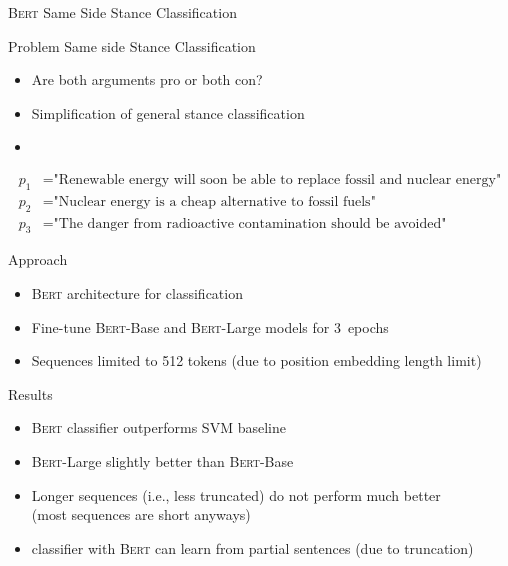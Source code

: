 \documentclass[english,handout]{mlutalk}
\newcommand{\Bert}{\textsc{Bert}\xspace}
\newcommand{\BertBase}{\textsc{Bert}-Base\xspace}
\newcommand{\BertLarge}{\textsc{Bert}-Large\xspace}
\begin{document}
\begin{frame}[allowframebreaks]{\Bert Same Side Stance Classification~\cite{OllingerDSBS2020}}
  
  \begin{block}{Problem}
    Same side  Stance Classification
    \begin{itemize}
      \item Are both arguments pro or both con?
      \item Simplification of general stance classification
      \item 
    \end{itemize}
  \end{block}

  \begin{example}
    \begin{align}
      p_1 &= \text{"Renewable energy will soon be able to replace fossil and nuclear energy"} \\
      p_2 &= \text{"Nuclear energy is a cheap alternative to fossil fuels"} \\
      p_3 &= \text{"The danger from radioactive contamination should be avoided"}
    \end{align}
  \end{example}
  
  \framebreak
  
  \begin{block}{Approach}
    \begin{itemize}
      \item \Bert architecture for classification
      \item Fine-tune \BertBase and \BertLarge models for 3~epochs
      \item Sequences limited to 512 tokens (due to position embedding length limit)
    \end{itemize}
  \end{block}

  \begin{block}{Results}
    \begin{itemize}
      \item \Bert classifier outperforms SVM baseline
      \item \BertLarge slightly better than \BertBase
      \item Longer sequences (i.e., less truncated) do not perform much better \\ (most sequences are short anyways)
      \item classifier with \Bert can learn from partial sentences (due to truncation)
    \end{itemize}
  \end{block}

\end{frame}
\end{document}
